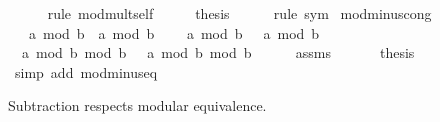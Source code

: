 \begin{isabellebody}
\ \ \ \ \isamarkupfalse%
\ {\isacharparenleft}{\kern0pt}rule\ mod{\isacharunderscore}{\kern0pt}mult{\isacharunderscore}{\kern0pt}self{}{\isacharparenright}{\kern0pt}\isanewline
\ \ \isamarkupfalse%
\ \isamarkupfalse%
\ {\isacharquery}{\kern0pt}thesis\isanewline
\ \ \ \ \isamarkupfalse%
\ {\isacharparenleft}{\kern0pt}rule\ sym{\isacharparenright}{\kern0pt}\isanewline
{}\isamarkupfalse%
%
\endisatagproof
{\isafoldproof}%
%
\isadelimproof
\isanewline
%
\endisadelimproof
\isanewline
{}\isamarkupfalse%
\ mod{\isacharunderscore}{\kern0pt}minus{\isacharunderscore}{\kern0pt}cong{\isacharcolon}{\kern0pt}\isanewline
\ \ \ {\isachardoublequoteopen}a\ mod\ b\ {\isacharequal}{\kern0pt}\ a{\isacharprime}{\kern0pt}\ mod\ b{\isachardoublequoteclose}\isanewline
\ \ \ {\isachardoublequoteopen}{\isacharparenleft}{\kern0pt}{\isacharminus}{\kern0pt}\ a{\isacharparenright}{\kern0pt}\ mod\ b\ {\isacharequal}{\kern0pt}\ {\isacharparenleft}{\kern0pt}{\isacharminus}{\kern0pt}\ a{\isacharprime}{\kern0pt}{\isacharparenright}{\kern0pt}\ mod\ b{\isachardoublequoteclose}\isanewline
%
\isadelimproof
%
\endisadelimproof
%
\isatagproof
{}\isamarkupfalse%
\ {\isacharminus}{\kern0pt}\isanewline
\ \ \isamarkupfalse%
\ {\isachardoublequoteopen}{\isacharparenleft}{\kern0pt}{\isacharminus}{\kern0pt}\ {\isacharparenleft}{\kern0pt}a\ mod\ b{\isacharparenright}{\kern0pt}{\isacharparenright}{\kern0pt}\ mod\ b\ {\isacharequal}{\kern0pt}\ {\isacharparenleft}{\kern0pt}{\isacharminus}{\kern0pt}\ {\isacharparenleft}{\kern0pt}a{\isacharprime}{\kern0pt}\ mod\ b{\isacharparenright}{\kern0pt}{\isacharparenright}{\kern0pt}\ mod\ b{\isachardoublequoteclose}\isanewline
\ \ \ \ \isamarkupfalse%
\ assms\ \isacommand{{\isachardot}{\kern0pt}{\isachardot}{\kern0pt}}\isamarkupfalse%
\isanewline
\ \ \isamarkupfalse%
\ \isamarkupfalse%
\ {\isacharquery}{\kern0pt}thesis\isanewline
\ \ \ \ \isamarkupfalse%
\ {\isacharparenleft}{\kern0pt}simp\ add{\isacharcolon}{\kern0pt}\ mod{\isacharunderscore}{\kern0pt}minus{\isacharunderscore}{\kern0pt}eq{\isacharparenright}{\kern0pt}\isanewline
{}\isamarkupfalse%
%
\endisatagproof
{\isafoldproof}%
%
\isadelimproof
%
\endisadelimproof
%
\begin{isamarkuptext}%
Subtraction respects modular equivalence.%
\end{isamarkuptext}\isamarkuptrue%
\isamarkupfalse%

\end{isabellebody}
